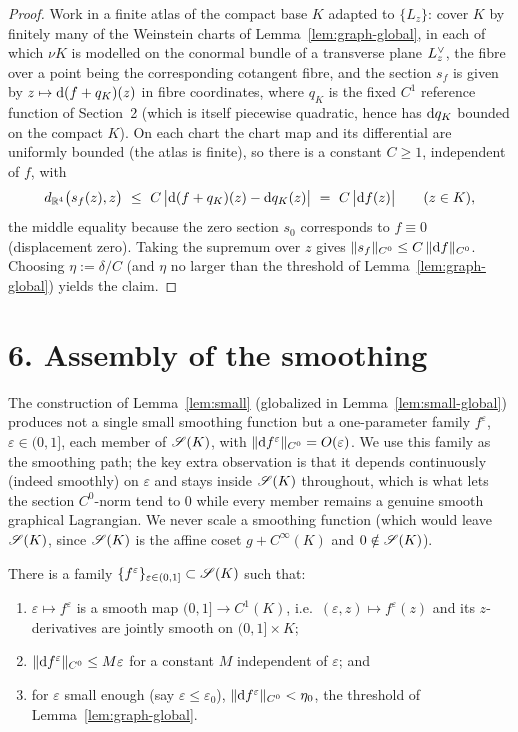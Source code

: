 \begin{proof}
Work in a finite atlas of the compact base $K$ adapted to $\{L_z\}$: cover $K$ by
finitely many of the Weinstein charts of Lemma~\ref{lem:graph-global}, in each of
which $\nu K$ is modelled on the conormal bundle of a transverse plane
$L^{\vee}_z$, the fibre over a point being the corresponding cotangent fibre, and
the section $s_f$ is given by $z\mapsto\mathrm d(f+q_K)(z)$ in fibre coordinates,
where $q_K$ is the fixed $C^1$ reference function of Section~2 (which is itself
piecewise quadratic, hence has $\mathrm d q_K$ bounded on the compact $K$). On each
chart the chart map and its differential are uniformly bounded (the atlas is
finite), so there is a constant $C\ge1$, independent of $f$, with
\[
d_{\qeightR^4}\bigl(s_f(z),z\bigr)\ \le\ C\,\bigl|\qeightdd(f+q_K)(z)-\qeightdd q_K(z)\bigr|
\ =\ C\,\bigl|\qeightdd f(z)\bigr|\qquad(z\in K),
\]
the middle equality because the zero section $s_0$ corresponds to $f\equiv0$
(displacement zero). Taking the supremum over $z$ gives
$\|s_f\|_{C^0}\le C\,\|\mathrm d f\|_{C^0}$. Choosing $\eta:=\delta/C$ (and
$\eta$ no larger than the threshold of Lemma~\ref{lem:graph-global}) yields the
claim.
\end{proof}

\section*{6. Assembly of the smoothing}

The construction of Lemma~\ref{lem:small} (globalized in Lemma~\ref{lem:small-global})
produces not a single small smoothing function but a one-parameter family
$f^\varepsilon$, $\varepsilon\in(0,1]$, each member of $\mathscr S(K)$, with
$\|\mathrm d f^\varepsilon\|_{C^0}=O(\varepsilon)$. We use this family as the smoothing
path; the key extra observation is that it depends continuously (indeed smoothly)
on $\varepsilon$ and stays inside $\mathscr S(K)$ throughout, which is what lets the
section $C^0$-norm tend to $0$ while every member remains a genuine smooth
graphical Lagrangian. We never scale a smoothing function (which would leave
$\mathscr S(K)$, since $\mathscr S(K)$ is the affine coset $g+C^\infty(K)$ and $0\notin\mathscr S(K)$).

\begin{qeightlemma}\label{lem:cont-family}
There is a family $\{f^\varepsilon\}_{\varepsilon\in(0,1]}\subset\mathscr S(K)$ such
that:
\begin{enumerate}[label=\textup{(\alph*)}]
\item $\varepsilon\mapsto f^\varepsilon$ is a smooth map $(0,1]\to C^1(K)$, i.e.\
$(\varepsilon,z)\mapsto f^\varepsilon(z)$ and its $z$-derivatives are jointly
smooth on $(0,1]\times K$;
\item $\|\mathrm d f^\varepsilon\|_{C^0}\le M\varepsilon$ for a constant $M$ independent
of $\varepsilon$; and
\item for $\varepsilon$ small enough (say $\varepsilon\le\varepsilon_0$),
$\|\mathrm d f^\varepsilon\|_{C^0}<\eta_0$, the threshold of
Lemma~\ref{lem:graph-global}.
\end{enumerate}
\end{qeightlemma}

